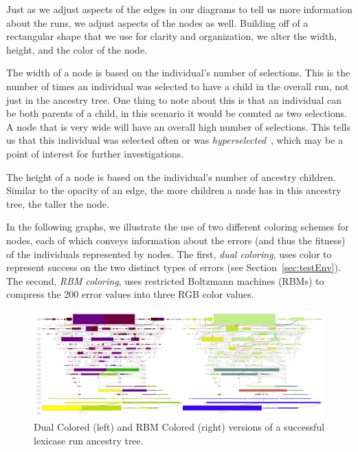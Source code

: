 \documentclass{sig-alternate}
\begin{document}
Just as we adjust aspects of the edges in our diagrams to tell us more information about the runs, we adjust aspects of the nodes as well. Building off of a rectangular shape that we use for clarity and organization, we alter the width, height, and the color of the node.

The width of a node is based on the individual's number of selections. This is the number of times an individual was selected to have a child in the overall run, not just in the ancestry tree. One thing to note about this is that an individual can be both parents of a child, in this scenario it would be counted as two selections. A node that is very wide will have an overall high number of selections. This tells us that this individual was selected often or was \textit{hyperselected}~\cite{Helmuth:2016:GECCO}, which may be a point of interest for further investigations. 

The height of a node is based on the individual's number of ancestry children. Similar to the opacity of an edge, the more children a node has in this ancestry tree, the taller the node.

In the following graphs, we illustrate the use of two different coloring 
schemes for nodes, each of which conveys information about the errors 
(and thus the fitness) of the individuals represented by nodes. 
The first, \emph{dual coloring}, uses color to represent success on the 
two distinct types of errors (see Section~\ref{sec:testEnv}). The second,
\emph{RBM coloring}, uses restricted Boltzmann machines (RBMs) to compress
the 200 error values into three RGB color values.

\begin{figure}
	\begin{center}
		\includegraphics[width=\textwidth]{../Figures/run0_dual_and_RBM_full.pdf}
	\end{center}
	\caption{Dual Colored (left) and RBM Colored (right) versions of a successful lexicase run ancestry tree.}
	\label{fig:lexRun0DualAndRBM}
\end{figure}
\end{document}

